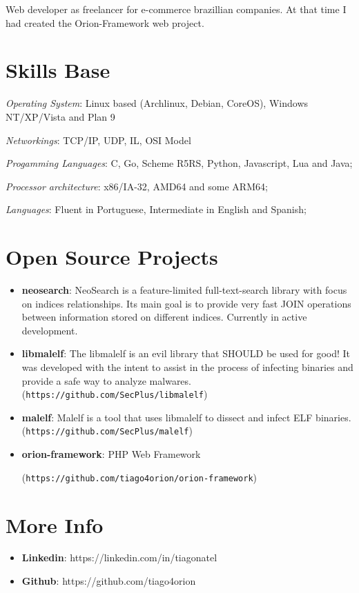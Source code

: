 \documentclass[margin]{res}
\begin{document}
\begin{resume}
   Web developer as freelancer for e-commerce brazillian companies. At that time I had created the Orion-Framework web project.



\section{Skills Base}  \textit{Operating System}:  Linux based (Archlinux, Debian, CoreOS), Windows NT/XP/Vista and Plan 9

			\textit{Networkings}: TCP/IP, UDP, IL, OSI Model
  
			\textit{Progamming Languages}: C, Go, Scheme R5RS, Python, Javascript, Lua and Java;
  
			\textit{Processor architecture}:  x86/IA-32, AMD64 and some ARM64;

			\textit{Languages}: Fluent in Portuguese, Intermediate in English and Spanish;
 
\section{Open Source Projects}
		\begin{itemize}
		    \vspace{2mm}
		    \item \textbf{neosearch}: NeoSearch is a feature-limited full-text-search library with focus on indices relationships. Its main goal is to provide very fast JOIN operations between information stored on different indices. Currently in active development.  \vspace{1mm}
		    \item \textbf{libmalelf}: The libmalelf is an evil library that SHOULD be used for good! It was developed
		                              with the intent to assist in the process of infecting binaries and provide a safe 
		                              way to analyze malwares. (\texttt{https://github.com/SecPlus/libmalelf})\vspace{1mm}
		                              
		    \item \textbf{malelf}: Malelf is a tool that uses libmalelf to dissect and infect ELF binaries. 
		                           (\texttt{https://github.com/SecPlus/malelf})
		 \item \textbf{orion-framework}: PHP Web Framework 
		 
		 	(\texttt{https://github.com/tiago4orion/orion-framework})
		
		\end{itemize}
 
\section{More Info}
    \begin{itemize}
        \item \textbf{Linkedin}: https://linkedin.com/in/tiagonatel
         \item \textbf{Github}: https://github.com/tiago4orion
    \end{itemize}


\end{resume} 
\end{document}
